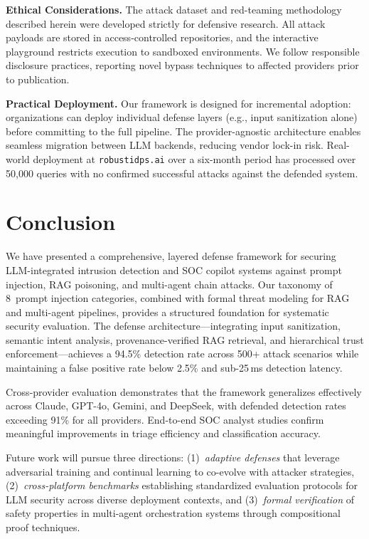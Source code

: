\documentclass[journal,twoside]{IEEEtran}
\begin{document}
\textbf{Ethical Considerations.} The attack dataset and red-teaming methodology described herein were developed strictly for defensive research. All attack payloads are stored in access-controlled repositories, and the interactive playground restricts execution to sandboxed environments. We follow responsible disclosure practices, reporting novel bypass techniques to affected providers prior to publication.

\textbf{Practical Deployment.} Our framework is designed for incremental adoption: organizations can deploy individual defense layers (e.g., input sanitization alone) before committing to the full pipeline. The provider-agnostic architecture enables seamless migration between LLM backends, reducing vendor lock-in risk. Real-world deployment at \texttt{robustidps.ai} over a six-month period has processed over 50{,}000 queries with no confirmed successful attacks against the defended system.

\section{Conclusion}\label{sec:conclusion}

We have presented a comprehensive, layered defense framework for securing LLM-integrated intrusion detection and SOC copilot systems against prompt injection, RAG poisoning, and multi-agent chain attacks. Our taxonomy of 8~prompt injection categories, combined with formal threat modeling for RAG and multi-agent pipelines, provides a structured foundation for systematic security evaluation. The defense architecture---integrating input sanitization, semantic intent analysis, provenance-verified RAG retrieval, and hierarchical trust enforcement---achieves a 94.5\% detection rate across 500+ attack scenarios while maintaining a false positive rate below 2.5\% and sub-25\,ms detection latency.

Cross-provider evaluation demonstrates that the framework generalizes effectively across Claude, GPT-4o, Gemini, and DeepSeek, with defended detection rates exceeding 91\% for all providers. End-to-end SOC analyst studies confirm meaningful improvements in triage efficiency and classification accuracy.

Future work will pursue three directions: (1)~\emph{adaptive defenses} that leverage adversarial training and continual learning to co-evolve with attacker strategies, (2)~\emph{cross-platform benchmarks} establishing standardized evaluation protocols for LLM security across diverse deployment contexts, and (3)~\emph{formal verification} of safety properties in multi-agent orchestration systems through compositional proof techniques.
\end{document}
